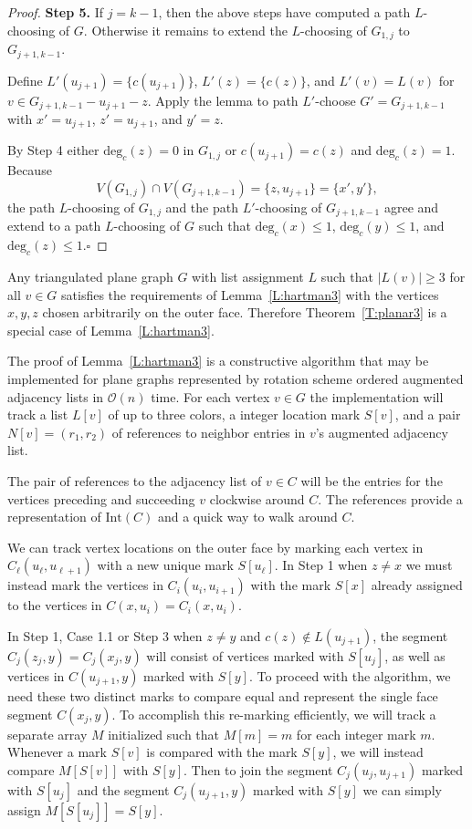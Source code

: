 \documentclass[12pt,letterpaper]{article}
\theoremstyle{plain}
\theoremstyle{definition}
\theoremstyle{break}
\newcommand{\ggcqedsymbol}{$\square$}
\newcommand{\ggcqed}{\hbox{}\nobreak\hbox{\quad\ggcqedsymbol}}
\newcommand{\ggcnopf}{\ggcqed}
\begin{document}
\begin{proof}
\textbf{Step 5.} If $j=k-1$, then the above steps have computed a path
$L$-choosing of $G$. Otherwise it remains to extend the $L$-choosing of
$G_{1,j}$ to $G_{j+1,k-1}$.

Define $L'(u_{j+1})=\{c(u_{j+1})\}$, $L'(z)=\{c(z)\}$, and $L'(v)=L(v)$ for
$v\in G_{j+1,k-1}-u_{j+1} -z$. Apply the lemma
to path $L'$-choose $G'=G_{j+1,k-1}$ with $x'=u_{j+1}$,
$z'=u_{j+1}$, and $y'=z$.

By Step 4 either $\text{deg}_c(z)=0$ in $G_{1,j}$ or
$c(u_{j+1})=c(z)$ and $\text{deg}_c(z)=1$.
Because
$$V(G_{1,j})\cap V(G_{j+1,k-1})=\{z,u_{j+1}\}=\{x',y'\},$$
the path
$L$-choosing of $G_{1,j}$ and the path $L'$-choosing of $G_{j+1,k-1}$
agree and extend to a path $L$-choosing of $G$ such that
$\text{deg}_c(x)\le1$,
$\text{deg}_c(y)\le 1$, and $\text{deg}_c(z)\le 1$.\ggcnopf
\end{proof}

Any triangulated plane graph $G$ with list assignment $L$ such that
$|L(v)|\ge 3$ for all $v\in G$ satisfies the requirements of
Lemma~\ref{L:hartman3} with the vertices $x,y,z$ chosen arbitrarily on the
outer face.
Therefore Theorem~\ref{T:planar3} is a special case of
Lemma~\ref{L:hartman3}.

The proof of Lemma~\ref{L:hartman3} is a constructive algorithm that may be
implemented for plane graphs represented by
rotation scheme ordered augmented adjacency lists in $\mathcal{O}(n)$ time.
For each vertex $v\in G$ the implementation will track a list $L[v]$ of up to
three colors,
a integer location mark $S[v]$, and a pair $N[v]=(r_1,r_2)$ of references to
neighbor entries in $v$'s augmented adjacency list.

The pair of references to
the adjacency list of $v\in C$
will be the entries for the vertices preceding and succeeding $v$ clockwise
around $C$. The references provide a representation of $\text{Int}(C)$ and a
quick way to walk around $C$.
 
We can track vertex locations on the outer face by marking each vertex in
$C_\ell(u_\ell,u_{\ell + 1})$ with a new unique mark $S[u_\ell]$.
In Step 1 when $z\ne x$ we must instead
mark the vertices in $C_i(u_i,u_{i+1})$ with the mark $S[x]$ 
already assigned to the vertices in $C(x,u_i)=C_i(x,u_i)$.

In Step 1, Case 1.1 or Step 3 when $z\ne y$ and $c(z)\not\in L(u_{j+1})$,
the segment $C_j(z_j,y)=C_j(x_j,y)$ will consist of vertices
marked with $S[u_j]$, as well as vertices in $C(u_{j+1},y)$ marked with $S[y]$.
To proceed with the algorithm, we need these two distinct marks to compare
equal and represent the single face segment $C(x_j,y)$.
To accomplish this re-marking efficiently, we
will track a separate array $M$ initialized such that
$M[m]=m$ for each integer mark $m$.
Whenever a mark $S[v]$ is compared with the mark $S[y]$, we will
instead compare
$M[S[v]]$ with $S[y]$. Then to join the segment $C_j(u_j,u_{j+1})$ marked with
$S[u_j]$ and the segment $C_j(u_{j+1},y)$ marked with $S[y]$ we can simply
assign $M[S[u_j]]=S[y]$.
\end{document}
